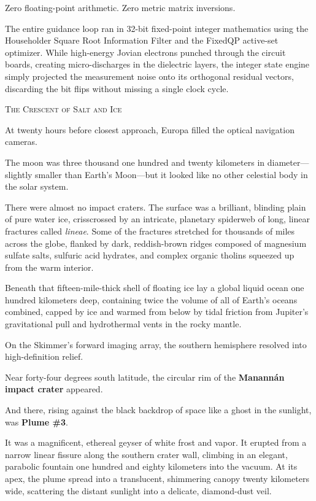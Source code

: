 \documentclass[12pt,twoside,openright]{book}
\newcommand{\sceneheader}[1]{%
  \par\vspace{1.8em}%
  {\noindent\centering\scshape\large #1\par}%
  \vspace{1.0em}%
  \noindent%
}
\newcommand{\dinkus}{%
  \par\vspace{1.2em}%
  {\noindent\centering{\large $\ast\quad\ast\quad\ast$}\par}%
  \vspace{1.2em}%
  \noindent%
}
\begin{document}
Zero floating-point arithmetic. Zero metric matrix inversions.

The entire guidance loop ran in 32-bit fixed-point integer mathematics
using the Householder Square Root Information Filter and the FixedQP
active-set optimizer. While high-energy Jovian electrons punched through
the circuit boards, creating micro-discharges in the dielectric layers,
the integer state engine simply projected the measurement noise onto its
orthogonal residual vectors, discarding the bit flips without missing a
single clock cycle.

\dinkus

\sceneheader{The Crescent of Salt and
Ice}

At twenty hours before closest approach, Europa filled the optical
navigation cameras.

The moon was three thousand one hundred and twenty kilometers in
diameter---slightly smaller than Earth's Moon---but it looked like no
other celestial body in the solar system.

There were almost no impact craters. The surface was a brilliant,
blinding plain of pure water ice, crisscrossed by an intricate,
planetary spiderweb of long, linear fractures called \emph{lineae}. Some
of the fractures stretched for thousands of miles across the globe,
flanked by dark, reddish-brown ridges composed of magnesium sulfate
salts, sulfuric acid hydrates, and complex organic tholins squeezed up
from the warm interior.

Beneath that fifteen-mile-thick shell of floating ice lay a global
liquid ocean one hundred kilometers deep, containing twice the volume of
all of Earth's oceans combined, capped by ice and warmed from below by
tidal friction from Jupiter's gravitational pull and hydrothermal vents
in the rocky mantle.

On the Skimmer's forward imaging array, the southern hemisphere resolved
into high-definition relief.

Near forty-four degrees south latitude, the circular rim of the
\textbf{Manannán impact crater} appeared.

And there, rising against the black backdrop of space like a ghost in
the sunlight, was \textbf{Plume \#3}.

It was a magnificent, ethereal geyser of white frost and vapor. It
erupted from a narrow linear fissure along the southern crater wall,
climbing in an elegant, parabolic fountain one hundred and eighty
kilometers into the vacuum. At its apex, the plume spread into a
translucent, shimmering canopy twenty kilometers wide, scattering the
distant sunlight into a delicate, diamond-dust veil.
\end{document}
